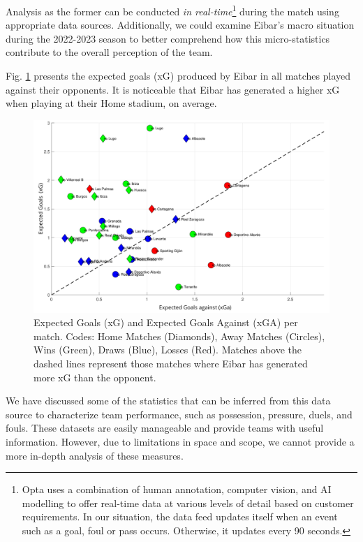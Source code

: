 \documentclass[
  10pt,
  twoside,nohyper]{book}
\begin{document}
Analysis as the former can be conducted \emph{in real-time}\footnote{Opta \citep{opta} uses a combination of human annotation, computer vision, and AI modelling to offer real-time data at various levels of detail based on customer requirements. In our situation, the data feed updates itself when an event such as a goal, foul or pass occurs. Otherwise, it updates every 90 seconds.} during the
match using appropriate data sources. Additionally, we could examine
Eibar's macro situation during the 2022-2023 season to better comprehend
how this micro-statistics contribute to the overall perception of the
team.

Fig. \ref{fig:xg-xga} presents the expected goals (xG) produced by Eibar in all matches played against their opponents. It is noticeable that Eibar has generated a higher xG when playing at their Home stadium, on average.

\begin{figure}[H]

{\centering \includegraphics[width=0.8\linewidth,]{imagenes/scat-xG-xGa} 

}

\caption{Expected Goals (xG) and Expected Goals Against (xGA) per match. Codes: Home Matches (Diamonds), Away Matches (Circles), Wins (Green), Draws (Blue), Losses (Red). Matches above the dashed lines represent those matches where Eibar has generated more xG than the opponent.}\label{fig:xg-xga}
\end{figure}

We have discussed some of the statistics that can be inferred from this data source to characterize team performance, such as possession, pressure, duels, and fouls. These datasets are easily manageable and provide teams with useful information. However, due to limitations in space and scope, we cannot provide a more in-depth analysis of these measures.
\end{document}
